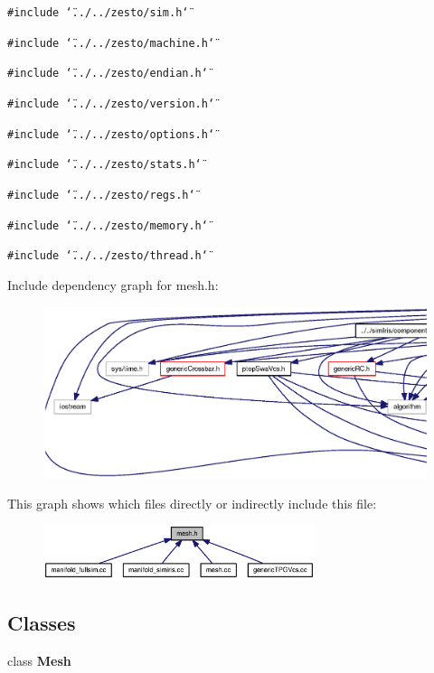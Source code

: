 {\tt \#include \char`\"{}../../zesto/sim.h\char`\"{}}\par
{\tt \#include \char`\"{}../../zesto/machine.h\char`\"{}}\par
{\tt \#include \char`\"{}../../zesto/endian.h\char`\"{}}\par
{\tt \#include \char`\"{}../../zesto/version.h\char`\"{}}\par
{\tt \#include \char`\"{}../../zesto/options.h\char`\"{}}\par
{\tt \#include \char`\"{}../../zesto/stats.h\char`\"{}}\par
{\tt \#include \char`\"{}../../zesto/regs.h\char`\"{}}\par
{\tt \#include \char`\"{}../../zesto/memory.h\char`\"{}}\par
{\tt \#include \char`\"{}../../zesto/thread.h\char`\"{}}\par


Include dependency graph for mesh.h:\nopagebreak
\begin{figure}[H]
\begin{center}
\leavevmode
\includegraphics[width=420pt]{mesh_8h__incl}
\end{center}
\end{figure}


This graph shows which files directly or indirectly include this file:\nopagebreak
\begin{figure}[H]
\begin{center}
\leavevmode
\includegraphics[width=225pt]{mesh_8h__dep__incl}
\end{center}
\end{figure}
\subsection*{Classes}
\begin{CompactItemize}
\item 
class {\bf Mesh}
\end{CompactItemize}
